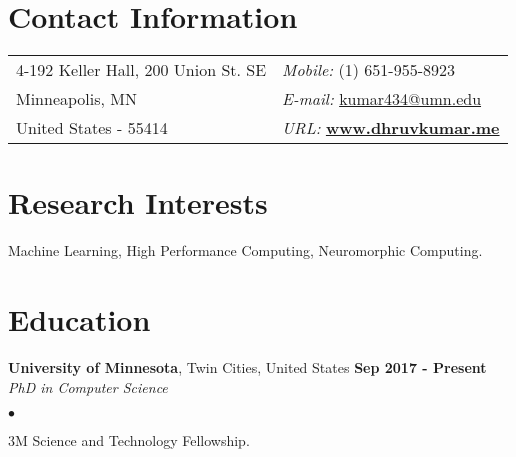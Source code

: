 \documentclass[margin,line]{res}
\newenvironment{list2}{
  \begin{list}{$\bullet$}{%
      \setlength{\itemsep}{0in}
      \setlength{\parsep}{0in} \setlength{\parskip}{0in}
      \setlength{\topsep}{0in} \setlength{\partopsep}{0in} 
      \setlength{\leftmargin}{0.2in}}}{\end{list}}
\begin{document}

\begin{resume}
\section{\sc Contact Information}
\vspace{.05in}
\begin{tabular}{@{}p{3in}p{4in}}
4-192 Keller Hall, 200 Union St. SE         & {\it Mobile:}  (1) 651-955-8923 \\
Minneapolis, MN & {\it E-mail:}  \href{mailto:kumar434@umn.edu }{kumar434@umn.edu }\\
 United States - 55414 &{\it URL:}  \href{http://www.dhruvkumar.me}{\bf www.dhruvkumar.me}
\end{tabular}


\section{\sc Research Interests}
Machine Learning, High Performance Computing, Neuromorphic Computing.

\section{\sc Education}
{\bf University of Minnesota}, Twin Cities, United States \hfill {\bf {Sep 2017 - Present}}\\
{\em PhD in Computer Science }
\vspace*{.3cm}
\begin{list2}
\item 3M Science and Technology Fellowship.


\end{list2}
\end{resume}
\end{document}
